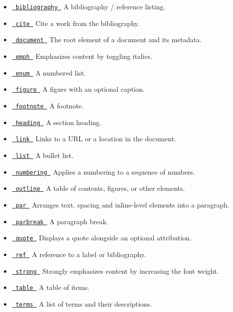 \begin{itemize}
\tightlist
\item
  \href{/docs/reference/model/bibliography/}{\texttt{\ bibliography\ }}
  { A bibliography / reference listing. }
\item
  \href{/docs/reference/model/cite/}{\texttt{\ cite\ }} { Cite a work
  from the bibliography. }
\item
  \href{/docs/reference/model/document/}{\texttt{\ document\ }} { The
  root element of a document and its metadata. }
\item
  \href{/docs/reference/model/emph/}{\texttt{\ emph\ }} { Emphasizes
  content by toggling italics. }
\item
  \href{/docs/reference/model/enum/}{\texttt{\ enum\ }} { A numbered
  list. }
\item
  \href{/docs/reference/model/figure/}{\texttt{\ figure\ }} { A figure
  with an optional caption. }
\item
  \href{/docs/reference/model/footnote/}{\texttt{\ footnote\ }} { A
  footnote. }
\item
  \href{/docs/reference/model/heading/}{\texttt{\ heading\ }} { A
  section heading. }
\item
  \href{/docs/reference/model/link/}{\texttt{\ link\ }} { Links to a URL
  or a location in the document. }
\item
  \href{/docs/reference/model/list/}{\texttt{\ list\ }} { A bullet list.
  }
\item
  \href{/docs/reference/model/numbering/}{\texttt{\ numbering\ }} {
  Applies a numbering to a sequence of numbers. }
\item
  \href{/docs/reference/model/outline/}{\texttt{\ outline\ }} { A table
  of contents, figures, or other elements. }
\item
  \href{/docs/reference/model/par/}{\texttt{\ par\ }} { Arranges text,
  spacing and inline-level elements into a paragraph. }
\item
  \href{/docs/reference/model/parbreak/}{\texttt{\ parbreak\ }} { A
  paragraph break. }
\item
  \href{/docs/reference/model/quote/}{\texttt{\ quote\ }} { Displays a
  quote alongside an optional attribution. }
\item
  \href{/docs/reference/model/ref/}{\texttt{\ ref\ }} { A reference to a
  label or bibliography. }
\item
  \href{/docs/reference/model/strong/}{\texttt{\ strong\ }} { Strongly
  emphasizes content by increasing the font weight. }
\item
  \href{/docs/reference/model/table/}{\texttt{\ table\ }} { A table of
  items. }
\item
  \href{/docs/reference/model/terms/}{\texttt{\ terms\ }} { A list of
  terms and their descriptions. }
\end{itemize}

